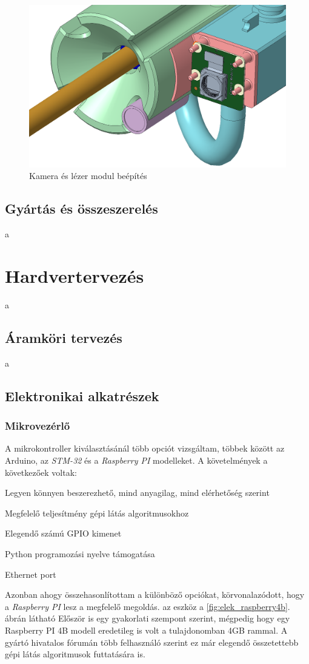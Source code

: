 \documentclass[12pt,a4paper]{article}
\begin{document}
\begin{figure}[h!]
	\centering
	\includegraphics[width=0.5\linewidth]{mech_dt4000kamera}
	\caption{Kamera és lézer modul beépítés}
	\label{fig:mech_dt4000kamera}
\end{figure}




\subsection{Gyártás és összeszerelés}
a
\section{Hardvertervezés}
a
\subsection{Áramköri tervezés}
a
\subsection{Elektronikai alkatrészek}
\subsubsection*{Mikrovezérlő}
A mikrokontroller kiválasztásánál több opciót vizsgáltam, többek között az {Arduino}, az \textsl{STM-32} és a \textsl{Raspberry PI} modelleket. A követelmények a következőek voltak:

\begin{list}{-}{}
	\item Legyen könnyen beszerezhető, mind anyagilag, mind elérhetőség szerint
	\item Megfelelő teljesítmény gépi látás algoritmusokhoz
	\item Elegendő számú GPIO kimenet
	\item Python programozási nyelve támogatása
	\item Ethernet port
\end{list}

Azonban ahogy összehasonlítottam a különböző opciókat, körvonalazódott, hogy a \textsl{Raspberry PI} lesz a megfelelő megoldás. az eszköz a \ref{fig:elek_raspberry4b}. ábrán látható Először is egy gyakorlati szempont szerint, mégpedig hogy egy Raspberry PI 4B modell eredetileg is volt a tulajdonomban 4GB rammal. A gyártó hivatalos fórumán több felhasználó szerint ez már elegendő összetettebb gépi látás algoritmusok futtatására is. \cite{4gbforum} \\
\end{document}
